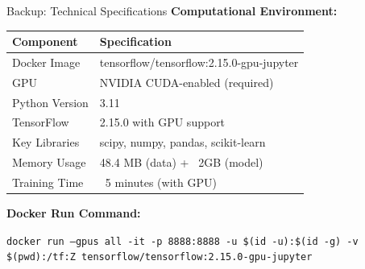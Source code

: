 \documentclass[aspectratio=169]{beamer}
\begin{document}
\appendix

\begin{frame}{Backup: Technical Specifications}
\textbf{Computational Environment:}

\begin{table}[h]
\small
\begin{tabular}{@{}ll@{}}
\toprule
\textbf{Component} & \textbf{Specification} \\
\midrule
Docker Image & tensorflow/tensorflow:2.15.0-gpu-jupyter \\
GPU & NVIDIA CUDA-enabled (required) \\
Python Version & 3.11 \\
TensorFlow & 2.15.0 with GPU support \\
Key Libraries & scipy, numpy, pandas, scikit-learn \\
Memory Usage & 48.4 MB (data) + ~2GB (model) \\
Training Time & ~5 minutes (with GPU) \\
\bottomrule
\end{tabular}
\end{table}

\vspace{3mm}

\textbf{Docker Run Command:}
\begin{center}
\small
\texttt{docker run --gpus all -it -p 8888:8888 -u \$(id -u):\$(id -g) -v \$(pwd):/tf:Z tensorflow/tensorflow:2.15.0-gpu-jupyter}
\end{center}
\end{frame}
\end{document}
